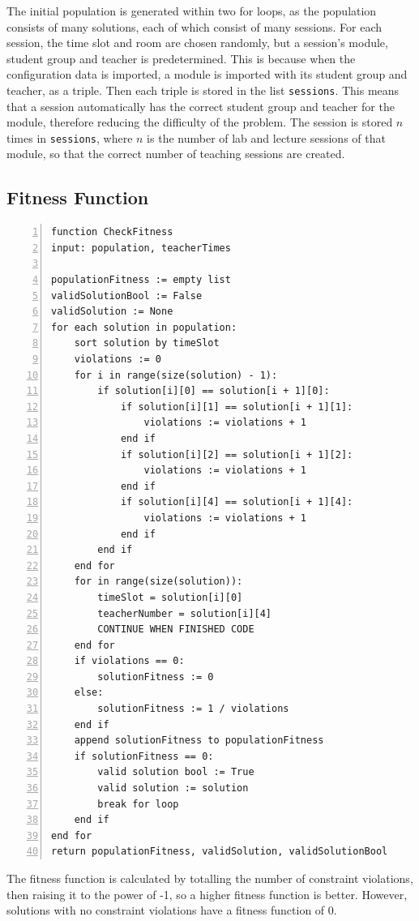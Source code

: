 \documentclass[a4paper, 12pt]{report}
\begin{document}
The initial population is generated within two for loops, as the population
consists of many solutions, each of which consist of many sessions.
For each session, the time slot and room are chosen randomly, but a session's 
module, student group and teacher is predetermined.
This is because when the configuration data is imported, a module is imported 
with its student group and teacher, as a triple.
Then each triple is stored in the list \verb|sessions|.
This means that a session automatically has the correct student group and 
teacher for the module, therefore reducing the difficulty of the problem.
The session is stored \( n \) times in \verb|sessions|, where \( n \) is the 
number of lab and lecture sessions of that module, so that the correct number 
of teaching sessions are created.

\subsection{Fitness Function}

\begin{Verbatim}[numbers=left, fontsize=\footnotesize]
function CheckFitness
input: population, teacherTimes

populationFitness := empty list
validSolutionBool := False
validSolution := None
for each solution in population:
    sort solution by timeSlot
    violations := 0
    for i in range(size(solution) - 1):
        if solution[i][0] == solution[i + 1][0]:
            if solution[i][1] == solution[i + 1][1]:
                violations := violations + 1
            end if
            if solution[i][2] == solution[i + 1][2]:
                violations := violations + 1
            end if
            if solution[i][4] == solution[i + 1][4]:
                violations := violations + 1
            end if
        end if
    end for
    for in range(size(solution)):
        timeSlot = solution[i][0]
        teacherNumber = solution[i][4]
        CONTINUE WHEN FINISHED CODE
    end for
    if violations == 0:
        solutionFitness := 0
    else:
	    solutionFitness := 1 / violations 
    end if
    append solutionFitness to populationFitness
    if solutionFitness == 0:
        valid solution bool := True
        valid solution := solution
        break for loop
    end if
end for
return populationFitness, validSolution, validSolutionBool
\end{Verbatim}

The fitness function is calculated by totalling the number of constraint 
violations, then raising it to the power of -1, so a higher fitness function is 
better.
However, solutions with no constraint violations have a fitness function of 0.
\end{document}
